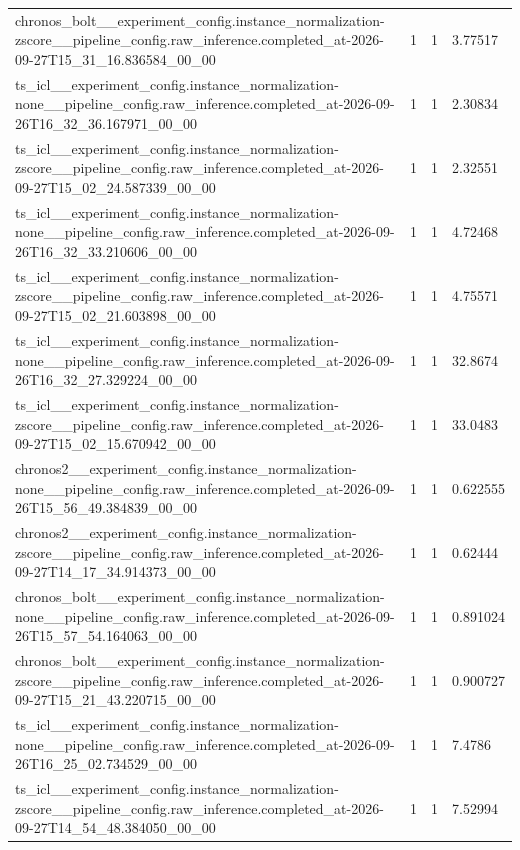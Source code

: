 \begin{tabular}{llll}
chronos\_bolt\_\_experiment\_config.instance\_normalization-zscore\_\_pipeline\_config.raw\_inference.completed\_at-2026-09-27T15\_31\_16.836584\_00\_00 & 1 & 1 & 3.77517 \\
ts\_icl\_\_experiment\_config.instance\_normalization-none\_\_pipeline\_config.raw\_inference.completed\_at-2026-09-26T16\_32\_36.167971\_00\_00 & 1 & 1 & 2.30834 \\
ts\_icl\_\_experiment\_config.instance\_normalization-zscore\_\_pipeline\_config.raw\_inference.completed\_at-2026-09-27T15\_02\_24.587339\_00\_00 & 1 & 1 & 2.32551 \\
ts\_icl\_\_experiment\_config.instance\_normalization-none\_\_pipeline\_config.raw\_inference.completed\_at-2026-09-26T16\_32\_33.210606\_00\_00 & 1 & 1 & 4.72468 \\
ts\_icl\_\_experiment\_config.instance\_normalization-zscore\_\_pipeline\_config.raw\_inference.completed\_at-2026-09-27T15\_02\_21.603898\_00\_00 & 1 & 1 & 4.75571 \\
ts\_icl\_\_experiment\_config.instance\_normalization-none\_\_pipeline\_config.raw\_inference.completed\_at-2026-09-26T16\_32\_27.329224\_00\_00 & 1 & 1 & 32.8674 \\
ts\_icl\_\_experiment\_config.instance\_normalization-zscore\_\_pipeline\_config.raw\_inference.completed\_at-2026-09-27T15\_02\_15.670942\_00\_00 & 1 & 1 & 33.0483 \\
chronos2\_\_experiment\_config.instance\_normalization-none\_\_pipeline\_config.raw\_inference.completed\_at-2026-09-26T15\_56\_49.384839\_00\_00 & 1 & 1 & 0.622555 \\
chronos2\_\_experiment\_config.instance\_normalization-zscore\_\_pipeline\_config.raw\_inference.completed\_at-2026-09-27T14\_17\_34.914373\_00\_00 & 1 & 1 & 0.62444 \\
chronos\_bolt\_\_experiment\_config.instance\_normalization-none\_\_pipeline\_config.raw\_inference.completed\_at-2026-09-26T15\_57\_54.164063\_00\_00 & 1 & 1 & 0.891024 \\
chronos\_bolt\_\_experiment\_config.instance\_normalization-zscore\_\_pipeline\_config.raw\_inference.completed\_at-2026-09-27T15\_21\_43.220715\_00\_00 & 1 & 1 & 0.900727 \\
ts\_icl\_\_experiment\_config.instance\_normalization-none\_\_pipeline\_config.raw\_inference.completed\_at-2026-09-26T16\_25\_02.734529\_00\_00 & 1 & 1 & 7.4786 \\
ts\_icl\_\_experiment\_config.instance\_normalization-zscore\_\_pipeline\_config.raw\_inference.completed\_at-2026-09-27T14\_54\_48.384050\_00\_00 & 1 & 1 & 7.52994 \\

\end{tabular}
